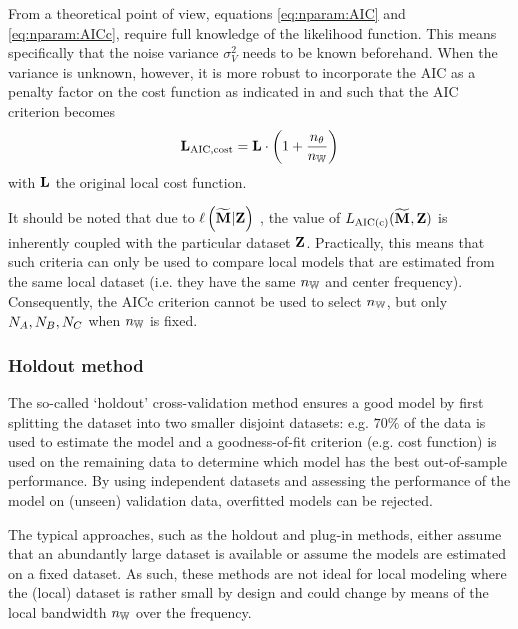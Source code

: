 \begin{remark}
From a theoretical point of view, equations \eqref{eq:nparam:AIC} and \eqref{eq:nparam:AICc}, require full knowledge of the likelihood function.
This means specifically that the noise variance $\sigma^{2}_{V}$ needs to be known beforehand.
When the variance is unknown, however, it is more robust to incorporate the \gls{AIC} as a penalty factor on the cost function as indicated in \citet[Section 7.4]{Ljung1999} and \citet[Section  11.3 and 19.7]{Pintelon2012} such that the \gls{AIC} criterion becomes
\begin{equation}
  \mathbf{L}_{\mathrm{AIC,cost}} = \mathbf{L} \cdot \left( 1 + \frac{n_{\theta}}{n_{\mathbb{W}}} \right)
\end{equation}
with $\mathbf{L}$ the original local cost function.
\end{remark}

\begin{remark}
It should be noted that due to $\operatorname{\ell}\left( \mathbf{\widetilde{M}}_{}  | \mathbf{Z} \right) $ , the value of $L_{\mathrm{AIC(c)}}(\mathbf{\widetilde{M}}_{} ,\mathbf{Z})$ is inherently coupled with the particular dataset $\mathbf{Z}$.
Practically, this means that such criteria can only be used to compare local models that are estimated from the same local dataset (i.e. they have the same $n_{\mathbb{W}}$ and center frequency).
Consequently, the \gls{AICc} criterion cannot be used to select $n_{\mathbb{W}}$, but only $N_{A},N_{B},N_{C}$ when $n_{\mathbb{W}}$ is fixed.
\end{remark}

\subsubsection{Holdout method}
The so-called `holdout' cross-validation method ensures a good model by first splitting the dataset into two smaller disjoint datasets: e.g. $70\%$ of the data  is used to estimate the model and a goodness-of-fit criterion (e.g. cost function) is used on the remaining data to determine which model has the best out-of-sample performance.
By using independent datasets and assessing the performance of the model on (unseen) validation data, overfitted models can be rejected.

\begin{remark}
The typical approaches, such as the holdout and plug-in methods, either assume that an abundantly large dataset is available or  assume the models are estimated on a fixed dataset.
As such, these methods are not ideal for local modeling where the (local) dataset is rather small by design and could change by means of the local bandwidth $n_{\mathbb{W}}$ over the frequency.
\end{remark}

